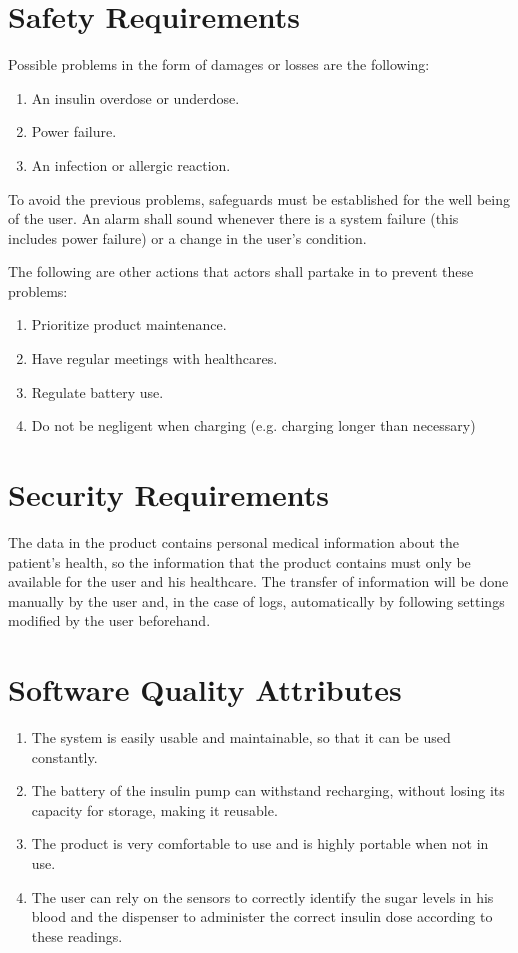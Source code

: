 \documentclass{scrreprt}
\begin{document}
\section{Safety Requirements}
Possible problems in the form of damages or losses are the following: 
\begin{enumerate}
  \item An \gls{insulin} overdose or underdose.
  \item Power failure.
  \item An infection or allergic reaction.
\end{enumerate}

To avoid the previous problems, safeguards must be established for the well being of the \gls{user}. An alarm
shall sound whenever there is a system failure (this includes power failure) or a change in the user's
condition.

The following are other actions that actors shall partake in to prevent these problems:
\begin{enumerate}
  \item Prioritize product maintenance. 
  \item Have regular meetings with \glspl{healthcare}.
  \item Regulate battery use.
  \item Do not be negligent when charging (e.g. charging longer than necessary) 
\end{enumerate}

\section{Security Requirements}
The data in the product contains personal medical information about the \gls{patient}'s health, so the 
information that the product contains must only be available for the \gls{user} and his \gls{healthcare}.
The transfer of information will be done manually by the user and, in the case of logs, automatically
by following settings modified by the user beforehand.

\section{Software Quality Attributes}
\begin{enumerate}
  \item The system is easily usable and maintainable, so that it can be used constantly.
  \item The battery of the insulin pump can withstand recharging, without losing its capacity for 
    storage, making it reusable.
  \item The product is very comfortable to use and is highly portable when not in use.
  \item The \gls{user} can rely on the sensors to correctly identify the sugar levels in his blood and the
    dispenser to administer the correct \gls{insulin} dose according to these readings.
\end{enumerate}
\end{document}
